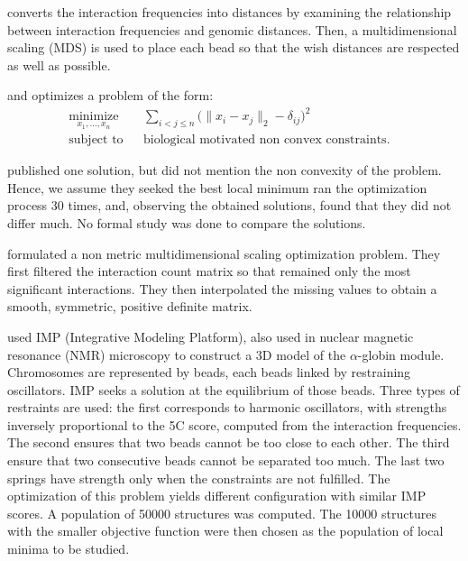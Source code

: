 \citet{duan:three} converts the interaction frequencies into distances by
examining the relationship between interaction frequencies and genomic
distances. Then, a multidimensional scaling (MDS) is used to place each bead
so that the wish distances are respected as well as possible.

\citet{tanizawa:mapping} and \citet{duan:three} optimizes a problem of the
form:
\begin{equation*}
\renewcommand{\arraystretch}{2}
\begin{array}{ccll}
\underset{x_1,\ldots, x_n}{\text{minimize}} & &
\underset{i<j\leq n}{\sum} \big(\|x_i - x_j\|_2 - \delta_{ij}\big)^2 &\\
\text{subject to}
& & \text{biological motivated non convex constraints.}
\end{array}
\end{equation*}

\citet{tanizawa:mapping} published one solution, but did not mention the non
convexity of the problem. Hence, we assume they seeked the best local minimum
\citet{duan:three} ran the optimization process 30 times, and, observing the
obtained solutions, found that they did not differ much. No formal study was
done to compare the solutions.

\citet{ben-elazar:spatial} formulated a non metric multidimensional scaling
optimization problem. They first filtered the interaction count matrix so that
remained only the most significant interactions. They then interpolated the
missing values to obtain a smooth, symmetric, positive definite matrix.

\citet{bau:three-dimensional} used IMP (Integrative Modeling Platform), also
used in nuclear magnetic resonance (NMR) microscopy to construct a 3D model of
the $\alpha$-globin module. Chromosomes are represented by beads, each beads
linked by restraining oscillators. IMP seeks a solution at the equilibrium of
those beads. Three types of restraints are used: the first  corresponds to
harmonic oscillators, with strengths inversely proportional to the 5C
score, computed from the interaction frequencies. The second ensures that two
beads cannot be too close to each other. The third ensure that two consecutive
beads cannot be separated too much. The last two springs have strength only
when the constraints are not fulfilled. The optimization of this problem
yields different configuration with similar IMP scores. A population of 50000
structures was computed. The 10000 structures with the smaller objective
function were then chosen as the population of local minima to be studied.

